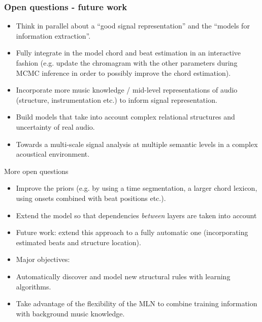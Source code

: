 \documentclass[12pt]{beamer}
\begin{document}
\begin{frame}
\frametitle{Open questions - future work}

\begin{itemize}
\item{ Think in parallel about a ``good signal representation'' and the ``models for information extraction''.} 
\medskip 
\item Fully integrate in the model chord and beat estimation in an interactive fashion (e.g. update the chromagram with the other parameters during MCMC inference in order to possibly improve the chord estimation).
\medskip
\item Incorporate more music knowledge / mid-level representations of audio (structure, instrumentation etc.) to inform signal representation. 
\medskip 
\item Build models that take into account complex relational structures and uncertainty of real audio. 
\medskip
\item Towards a multi-scale signal analysis at multiple semantic levels in a complex acoustical environment.
\end{itemize}
\end{frame}


\begin{frame}{More open questions}
\begin{itemize} 
\item Improve the priors (e.g. by using a time segmentation, a larger chord lexicon, using onsets combined with beat positions etc.). 
\item Extend the model so that dependencies \textit{between} layers are taken into account

\item Future work: extend this approach to a fully automatic one (incorporating estimated beats and structure location). 
\medskip

\item Major objectives: 
\end{itemize}
\begin{itemize}
	\item Automatically discover and model new structural rules with learning algorithms.
	\item Take advantage of the flexibility of the MLN to combine training information with background music knowledge.
\end{itemize}
\end{frame}
\end{document}
